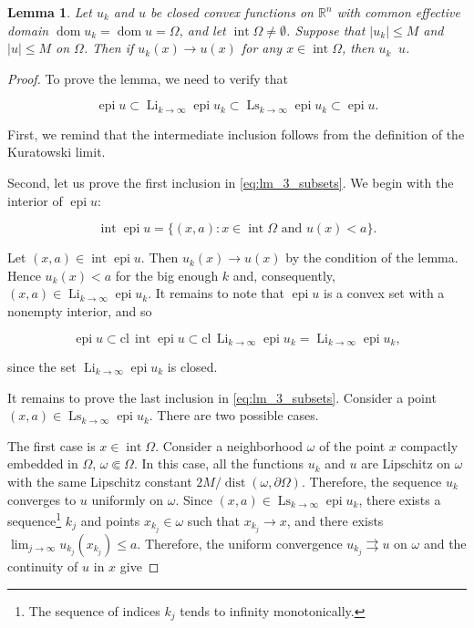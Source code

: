 \documentclass[14pt]{extarticle}
\renewcommand{\le}{\leqslant}
\newcommand{\R}{\mathbb{R}}
\DeclareMathOperator{\dom}{\mathrm{dom}}
\DeclareMathOperator{\epi}{\mathrm{epi}}
\DeclareMathOperator{\Int}{\mathrm{int}}
\DeclareMathOperator{\dist}{\mathrm{dist}}
\DeclareMathOperator{\toe}{\stackrel{e}{\to}}
\DeclareMathOperator*{\Li}{\mathrm{Li}}
\DeclareMathOperator*{\Ls}{\mathrm{Ls}}
\newtheorem{lemma}{Lemma}
\theoremstyle{remark}
\theoremstyle{definition}
\begin{document}
\begin{lemma}
\label{lm:pointwise_toe}
	Let $u_k$ and $u$ be closed convex functions on $\R^n$ with common effective domain $\dom u_k=
\dom u=\Omega$, and let $\Int\Omega\ne\emptyset$. Suppose that $|u_k|\le M$ and $|u|\le M$ on $\Omega$. Then if  $u_k(x)\to u(x)$ for any $x\in\Int\Omega$, then $u_k\toe u$.
\end{lemma}
	
\begin{proof}
	To prove the lemma, we need to verify that
		
	\begin{equation}
	\label{eq:lm_3_subsets}
		\epi u \subset \Li_{k\to\infty}\epi u_k\subset \Ls_{k\to\infty}\epi u_k\subset \epi u.
	\end{equation}

	\noindent First, we remind that the intermediate inclusion follows from the definition of the Kuratowski limit. 
	
	Second, let us prove the first inclusion in \eqref{eq:lm_3_subsets}. We begin with the interior of $\epi u$:
	
	\[
		\Int\epi u = \{(x,a):x\in\Int\Omega\mbox{ and }u(x)<a\}.
	\]

	\noindent Let $(x,a)\in\Int\epi u$. Then $u_k(x)\to u(x)$ by the condition of the lemma.  Hence  $u_k(x)<a$ for the big enough $k$ and, consequently,  $(x,a)\in\Li_{k\to\infty}\epi u_k$. It remains to note that $\epi u$   is a convex set with a nonempty interior, and so
	
	\[
		\epi u \subset \mathrm{cl}\,\Int\epi u \subset 
		\mathrm{cl}\,\Li_{k\to\infty}\epi u_k = \Li_{k\to\infty}\epi u_k,
	\]

	\noindent since the set $\Li_{k\to\infty}\epi u_k$ is closed.
	
	It remains to prove the last inclusion in \eqref{eq:lm_3_subsets}. Consider a point $(x,a)\in\Ls_{k\to\infty}\epi u_k$. There are two possible cases.

	The first case is $x\in\Int\Omega$. Consider a neighborhood $\omega$ of the point $x$ compactly embedded in $\Omega$, $\omega\Subset\Omega$. In this case, all the functions $u_k$ and $u$ are Lipschitz on $\omega$ with the same Lipschitz constant $2M/\dist(\omega,\partial\Omega)$. Therefore, the sequence $u_k$ converges to $u$ uniformly on $\omega$. Since $(x,a)\in\Ls_{k\to\infty}\epi u_k$, there exists a sequence\footnote{The sequence of indices $k_j$ tends to infinity monotonically.}  $k_j$ and points $x_{k_j}\in\omega$ such that $x_{k_j}\to x$, and there exists $\lim_{j\to\infty} u_{k_j}(x_{k_j})\le a$. Therefore, the uniform convergence $u_{k_j}\rightrightarrows u$ on $\omega$ and the continuity of $u$ in $x$ give
	

\end{proof}
\end{document}

